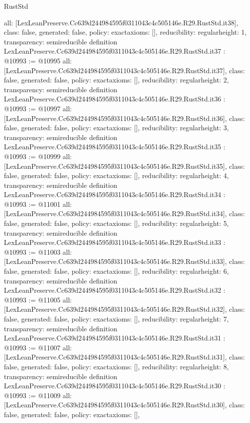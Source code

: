 \begin{lexlean}{RustStd}
\begin{coremodule}
{  all: [LexLeanPreserve.Cc639d244984595f0311043c4c505146e.R29.RustStd.it38],
  class: false,
  generated: false,
  policy: exact{axioms: []},
  reducibility: regular{height: 1},
  transparency: semireducible
}
definition LexLeanPreserve.Cc639d244984595f0311043c4c505146e.R29.RustStd.it37 : @10993 := @10995 {
  all: [LexLeanPreserve.Cc639d244984595f0311043c4c505146e.R29.RustStd.it37],
  class: false,
  generated: false,
  policy: exact{axioms: []},
  reducibility: regular{height: 2},
  transparency: semireducible
}
definition LexLeanPreserve.Cc639d244984595f0311043c4c505146e.R29.RustStd.it36 : @10993 := @10997 {
  all: [LexLeanPreserve.Cc639d244984595f0311043c4c505146e.R29.RustStd.it36],
  class: false,
  generated: false,
  policy: exact{axioms: []},
  reducibility: regular{height: 3},
  transparency: semireducible
}
definition LexLeanPreserve.Cc639d244984595f0311043c4c505146e.R29.RustStd.it35 : @10993 := @10999 {
  all: [LexLeanPreserve.Cc639d244984595f0311043c4c505146e.R29.RustStd.it35],
  class: false,
  generated: false,
  policy: exact{axioms: []},
  reducibility: regular{height: 4},
  transparency: semireducible
}
definition LexLeanPreserve.Cc639d244984595f0311043c4c505146e.R29.RustStd.it34 : @10993 := @11001 {
  all: [LexLeanPreserve.Cc639d244984595f0311043c4c505146e.R29.RustStd.it34],
  class: false,
  generated: false,
  policy: exact{axioms: []},
  reducibility: regular{height: 5},
  transparency: semireducible
}
definition LexLeanPreserve.Cc639d244984595f0311043c4c505146e.R29.RustStd.it33 : @10993 := @11003 {
  all: [LexLeanPreserve.Cc639d244984595f0311043c4c505146e.R29.RustStd.it33],
  class: false,
  generated: false,
  policy: exact{axioms: []},
  reducibility: regular{height: 6},
  transparency: semireducible
}
definition LexLeanPreserve.Cc639d244984595f0311043c4c505146e.R29.RustStd.it32 : @10993 := @11005 {
  all: [LexLeanPreserve.Cc639d244984595f0311043c4c505146e.R29.RustStd.it32],
  class: false,
  generated: false,
  policy: exact{axioms: []},
  reducibility: regular{height: 7},
  transparency: semireducible
}
definition LexLeanPreserve.Cc639d244984595f0311043c4c505146e.R29.RustStd.it31 : @10993 := @11007 {
  all: [LexLeanPreserve.Cc639d244984595f0311043c4c505146e.R29.RustStd.it31],
  class: false,
  generated: false,
  policy: exact{axioms: []},
  reducibility: regular{height: 8},
  transparency: semireducible
}
definition LexLeanPreserve.Cc639d244984595f0311043c4c505146e.R29.RustStd.it30 : @10993 := @11009 {
  all: [LexLeanPreserve.Cc639d244984595f0311043c4c505146e.R29.RustStd.it30],
  class: false,
  generated: false,
  policy: exact{axioms: []},
}
\end{coremodule}
\end{lexlean}
